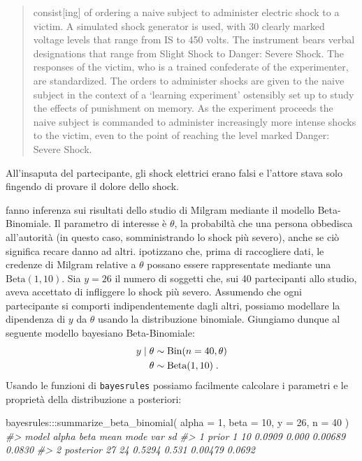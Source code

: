 \documentclass[
  10pt,
  italian,
  a4paper,
  extrafontsizes,onecolumn,openright
  ]{memoir}
\newenvironment{Shaded}{\begin{snugshade}}{\end{snugshade}}
\newcommand{\AttributeTok}[1]{\textcolor[rgb]{0.77,0.63,0.00}{#1}}
\newcommand{\CommentTok}[1]{\textcolor[rgb]{0.56,0.35,0.01}{\textit{#1}}}
\newcommand{\DecValTok}[1]{\textcolor[rgb]{0.00,0.00,0.81}{#1}}
\newcommand{\FunctionTok}[1]{\textcolor[rgb]{0.00,0.00,0.00}{#1}}
\newcommand{\NormalTok}[1]{#1}
\newcommand{\SpecialCharTok}[1]{\textcolor[rgb]{0.00,0.00,0.00}{#1}}
\DeclareMathOperator{\Bin}{Bin} %
\theoremstyle{definition}
\theoremstyle{definition}
\theoremstyle{definition}
\theoremstyle{definition}
\theoremstyle{remark}
\begin{document}
\begin{quote}
consist{[}ing{]} of ordering a naive subject to administer electric shock to a victim. A simulated shock generator is used, with 30 clearly marked voltage levels that range from IS to 450 volts. The instrument bears verbal designations that range from Slight Shock to Danger: Severe Shock. The responses of the victim, who is a trained confederate of the experimenter, are standardized. The orders to administer shocks are given to the naive subject in the context of a `learning experiment' ostensibly set up to study the effects of punishment on memory. As the experiment proceeds the naive subject is commanded to administer increasingly more intense shocks to the victim, even to the point of reaching the level marked Danger: Severe Shock.
\end{quote}

\noindent
All'insaputa del partecipante, gli shock elettrici erano falsi e l'attore stava solo fingendo di provare il dolore dello shock.

\textcite{Johnson2022bayesrules} fanno inferenza sui risultati dello studio di Milgram mediante il modello Beta-Binomiale. Il parametro di interesse è \(\theta\), la probabiltà che una persona obbedisca all'autorità (in questo caso, somministrando lo shock più severo), anche se ciò significa recare danno ad altri. \textcite{Johnson2022bayesrules} ipotizzano che, prima di raccogliere dati, le credenze di Milgram relative a \(\theta\) possano essere rappresentate mediante una \(\mbox{Beta}(1, 10)\). Sia \(y = 26\) il numero di soggetti che, sui 40 partecipanti allo studio, aveva accettato di infliggere lo shock più severo. Assumendo che ogni partecipante si comporti indipendentemente dagli altri, possiamo modellare la dipendenza di \(y\) da \(\theta\) usando la distribuzione binomiale. Giungiamo dunque al seguente modello bayesiano Beta-Binomiale:
\begin{align}
y \mid \theta & \sim \Bin(n = 40, \theta) \notag\\
\theta & \sim \text{Beta}(1, 10) \; . \notag
\end{align}
Usando le funzioni di \texttt{bayesrules} possiamo facilmente calcolare i parametri e le proprietà della distribuzione a posteriori:

\begin{Shaded}
\begin{Highlighting}[]
\NormalTok{bayesrules}\SpecialCharTok{:::}\FunctionTok{summarize\_beta\_binomial}\NormalTok{(}
  \AttributeTok{alpha =} \DecValTok{1}\NormalTok{, }\AttributeTok{beta =} \DecValTok{10}\NormalTok{, }\AttributeTok{y =} \DecValTok{26}\NormalTok{, }\AttributeTok{n =} \DecValTok{40}
\NormalTok{)}
\CommentTok{\#\textgreater{}       model alpha beta   mean  mode     var     sd}
\CommentTok{\#\textgreater{} 1     prior     1   10 0.0909 0.000 0.00689 0.0830}
\CommentTok{\#\textgreater{} 2 posterior    27   24 0.5294 0.531 0.00479 0.0692}
\end{Highlighting}
\end{Shaded}
\end{document}
